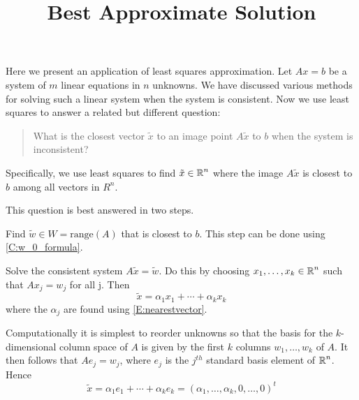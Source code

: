 \documentclass{ximera}
\title{Best Approximate Solution}
\begin{document}
\begin{abstract}
\end{abstract}
\maketitle

\label{S:BAS}

Here we present an application of least squares approximation.
Let $Ax = b$ be a system of $m$ linear equations in $n$ unknowns.  
We have discussed various methods for solving such a linear system when the 
system is consistent. Now we use least squares to answer a related but different question: 
\begin{quote}
What is the closest vector $\tilde{x}$ to an image point  $A\tilde{x}$ to $b$ 
when the system is inconsistent?  
\end{quote}
Specifically, we use least squares to find $\tilde{x}\in\mbox{$\mathbb{R}$}^n$ where 
the image $A\tilde{x}$ is closest to $b$ among all vectors in $R^n$. 

This question is best answered in two steps.  
\begin{enumeratea}
\item Find $\tilde{w}\in W = \mathrm{range}(A)$ that is closest to $b$.  
This step can be done using \eqref{C:w_0_formula}.
\item Solve the consistent system $A\tilde{x} = \tilde{w}$.  Do this by choosing  
$x_1,\ldots,x_k\in\mbox{$\mathbb{R}$}^n$ such that $Ax_j = w_j$ for all j.  Then 
\[
\tilde{x} = \alpha_1 x_1 + \cdots + \alpha_k x_k
\]
where the $\alpha_j$ are found using \eqref{E:nearestvector}.
\end{enumeratea} 
Computationally it is simplest to reorder unknowns so that the basis for the 
$k$-dimensional column space of $A$ is given by the first $k$ columns 
$w_1,\ldots,w_k$ of $A$. It then follows that $Ae_j = w_j$, where $e_j$ 
is the $j^{th}$ standard basis element of $\mbox{$\mathbb{R}$}^n$.  Hence
\[
\tilde{x} = \alpha_1 e_1 + \cdots + \alpha_k e_k  
= (\alpha_1,\ldots,\alpha_k, 0, \ldots,0)^t
\]
\end{document}

